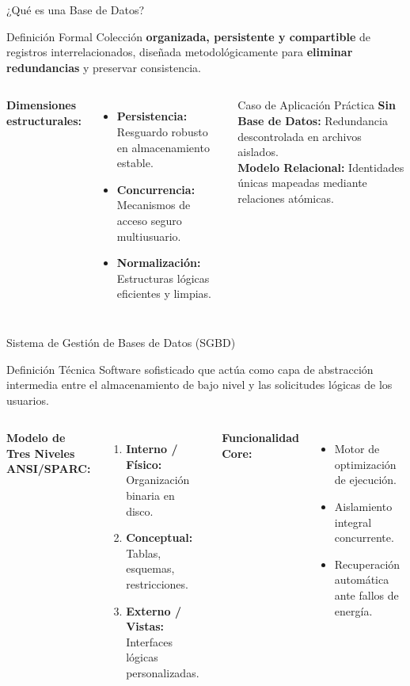 \documentclass[12pt, aspectratio=169, UTF8]{beamer}
\begin{document}
\begin{frame}{¿Qué es una Base de Datos?}
  \begin{block}{Definición Formal}
    Colección \textbf{organizada, persistente y compartible} de registros interrelacionados, diseñada metodológicamente para \textbf{eliminar redundancias} y preservar consistencia.
  \end{block}
  \vspace{4pt}
  \begin{columns}[T]
      \textbf{Dimensiones estructurales:}
      \begin{itemize}
        \item \textbf{Persistencia:} Resguardo robusto en almacenamiento estable.
        \item \textbf{Concurrencia:} Mecanismos de acceso seguro multiusuario.
        \item \textbf{Normalización:} Estructuras lógicas eficientes y limpias.
      \end{itemize}
      \begin{exampleblock}{Caso de Aplicación Práctica}
        \textbf{Sin Base de Datos:} Redundancia descontrolada en archivos aislados.\\[4pt]
        \textbf{Modelo Relacional:} Identidades únicas mapeadas mediante relaciones atómicas.
      \end{exampleblock}
  \end{columns}
\end{frame}

\begin{frame}{Sistema de Gestión de Bases de Datos (SGBD)}
  \begin{block}{Definición Técnica}
    Software sofisticado que actúa como capa de abstracción intermedia entre el almacenamiento de bajo nivel y las solicitudes lógicas de los usuarios.
  \end{block}
  \begin{columns}[T]
      \textbf{Modelo de Tres Niveles ANSI/SPARC:}
      \begin{enumerate}
        \item \textbf{Interno / Físico:} Organización binaria en disco.
        \item \textbf{Conceptual:} Tablas, esquemas, restricciones.
        \item \textbf{Externo / Vistas:} Interfaces lógicas personalizadas.
      \end{enumerate}
      \textbf{Funcionalidad Core:}
      \begin{itemize}
        \item Motor de optimización de ejecución.
        \item Aislamiento integral concurrente.
        \item Recuperación automática ante fallos de energía.
      \end{itemize}
  \end{columns}
\end{frame}
\end{document}
